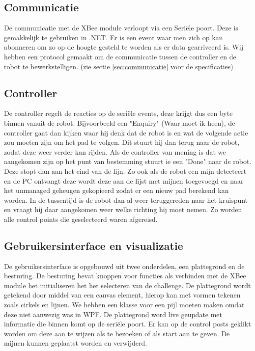 \documentclass{report}
\begin{document}
\subsection{Communicatie}
De communicatie met de XBee module verloopt via een Seriële poort. Deze is gemakkelijk te gebruiken in .NET. Er is een event waar men zich op kan abonneren om zo op de hoogte gesteld te worden als er data gearriveerd is. Wij hebben een protocol gemaakt om de communicatie tussen de controller en de robot te bewerkstelligen. (zie sectie \ref{sec:communicatie} voor de specificaties)

\subsection{Controller}
De controller regelt de reacties op de seriële events, deze krijgt dus een byte binnen vanuit de robot. Bijvoorbeeld een "Enquiry" (Waar moet ik heen), de controller gaat dan kijken waar hij denk dat de robot is en wat de volgende actie zou moeten zijn om het pad te volgen.
Dit stuurt hij dan terug naar de robot, zodat deze weer verder kan rijden.
Als de controller van mening is dat we aangekomen zijn op het punt van bestemming stuurt ie een "Done" naar de robot. Deze stopt dan aan het eind van de lijn.
Zo ook als de robot een mijn detecteert en de PC ontvangt deze wordt deze aan de lijst met mijnen toegevoegd en naar het unmanaged geheugen gekopieerd zodat er een nieuw pad berekend kan worden.
In de tussentijd is de robot dan al weer teruggereden naar het kruispunt en vraagt hij daar aangekomen weer welke richting hij moet nemen.
Zo worden alle control points die geselecteerd waren afgereisd.
\subsection{Gebruikersinterface en visualizatie}
De gebruikersinterface is opgebouwd uit twee onderdelen, een plattegrond en de besturing.
De besturing bevat knoppen voor functies als verbinden met de XBee module het initialiseren het het selecteren van de challenge.
De plattegrond wordt getekend door middel van een canvas element, hierop kan met vormen tekenen zoals cirkels en lijnen. We hebben een klasse voor een pijl moeten maken omdat deze niet aanwezig was in WPF.
De plattegrond word live geupdate met informatie die binnen komt op de seriële poort.
Er kan op de control posts geklikt worden om deze aan te wijzen als te bezoeken of als start aan te geven.
De mijnen kunnen geplaatst worden en verwijderd.
\end{document}
